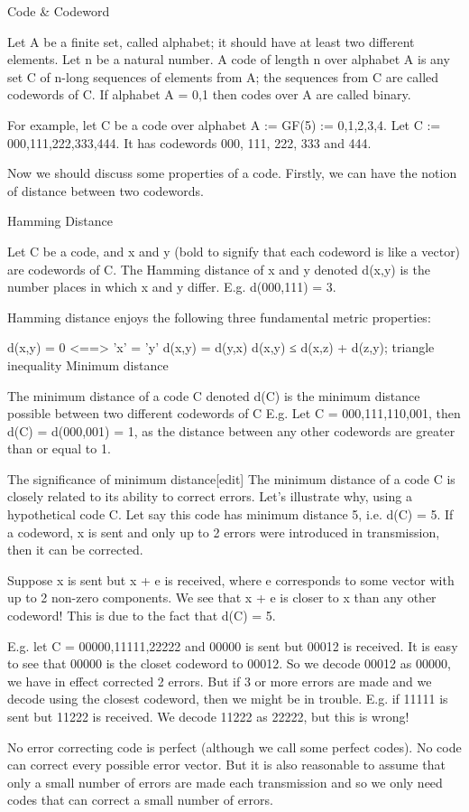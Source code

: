 
Code & Codeword

Let A be a finite set, called alphabet; it should have at least two different elements. Let n be a natural number. A code of length n over alphabet A is any set C of n-long sequences of elements from A; the sequences from C are called codewords of C.
If alphabet A = {0,1} then codes over A are called binary.

For example, let C be a code over alphabet A := GF(5) := {0,1,2,3,4}. Let C := {000,111,222,333,444}. It has codewords 000, 111, 222, 333 and 444.

Now we should discuss some properties of a code. Firstly, we can have the notion of distance between two codewords.

Hamming Distance

Let C be a code, and x and y (bold to signify that each codeword is like a vector) are codewords of C. The Hamming distance of x and y denoted
d(x,y)
is the number places in which x and y differ.
E.g. d(000,111) = 3.

Hamming distance enjoys the following three fundamental metric properties:

d(x,y) = 0 <==> 'x' = 'y'
d(x,y) = d(y,x)
d(x,y) ≤ d(x,z) + d(z,y); triangle inequality
Minimum distance

The minimum distance of a code C denoted d(C) is the minimum distance possible between two different codewords of C
E.g. Let C = {000,111,110,001}, then d(C) = d(000,001) = 1, as the distance between any other codewords are greater than or equal to 1.

The significance of minimum distance[edit]
The minimum distance of a code C is closely related to its ability to correct errors. Let's illustrate why, using a hypothetical code C. Let say this code has minimum distance 5, i.e. d(C) = 5. If a codeword, x is sent and only up to 2 errors were introduced in transmission, then it can be corrected.

Suppose x is sent but x + e is received, where e corresponds to some vector with up to 2 non-zero components. We see that x + e is closer to x than any other codeword! This is due to the fact that d(C) = 5.

E.g. let C = {00000,11111,22222} and 00000 is sent but 00012 is received. It is easy to see that 00000 is the closet codeword to 00012. So we decode 00012 as 00000, we have in effect corrected 2 errors. But if 3 or more errors are made and we decode using the closest codeword, then we might be in trouble. E.g. if 11111 is sent but 11222 is received. We decode 11222 as 22222, but this is wrong!

No error correcting code is perfect (although we call some perfect codes). No code can correct every possible error vector. But it is also reasonable to assume that only a small number of errors are made each transmission and so we only need codes that can correct a small number of errors.
